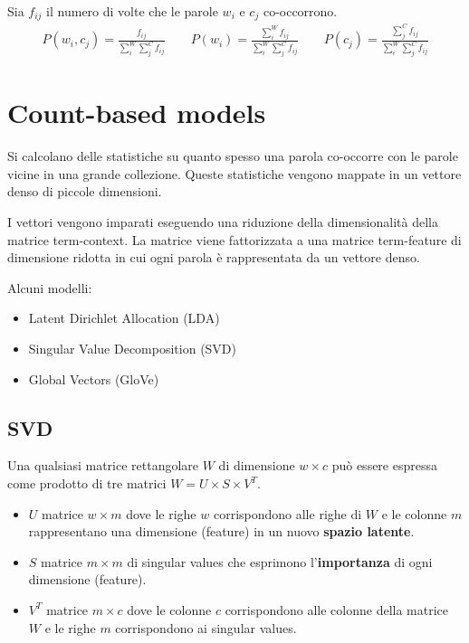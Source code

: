 Sia $f_{ij}$ il numero di volte che le parole $w_i$ e $c_j$ co-occorrono.
%
\begin{align*}
  P(w_i, c_j) = \frac{f_{ij}}{\sum_i^W\sum_j^C f_{ij}} \qquad
  P(w_i) = \frac{\sum_i^W f_{ij}}{\sum_i^W\sum_j^C f_{ij}} \qquad
  P(c_j) = \frac{\sum_j^C f_{ij}}{\sum_i^W\sum_j^C f_{ij}}
\end{align*}


\section{Count-based models}
Si calcolano delle statistiche su quanto spesso una parola co-occorre con le parole vicine in una grande collezione.
Queste statistiche vengono mappate in un vettore denso di piccole dimensioni.

I vettori vengono imparati eseguendo una riduzione della dimensionalità della matrice term-context.
La matrice viene fattorizzata a una matrice term-feature di dimensione ridotta in cui ogni parola è rappresentata da un vettore denso.

Alcuni modelli:
\begin{itemize}
  \item Latent Dirichlet Allocation (LDA)
  \item Singular Value Decomposition (SVD)
  \item Global Vectors (GloVe)
\end{itemize}

\subsection{SVD}
Una qualsiasi matrice rettangolare $W$ di dimensione $w \times c$ può essere espressa come prodotto di tre matrici $W = U \times S \times V^T$.
\begin{itemize}
  \item $U$ matrice $w \times m$ dove le righe $w$ corrispondono alle righe di $W$ e le colonne $m$ rappresentano una dimensione (feature) in un nuovo \textbf{spazio latente}.
  \item $S$ matrice $m \times m$ di singular values che esprimono l'\textbf{importanza} di ogni dimensione (feature).
  \item $V^T$ matrice $m \times c$ dove le colonne $c$ corrispondono alle colonne della matrice $W$ e le righe $m$ corrispondono ai singular values.
\end{itemize}

